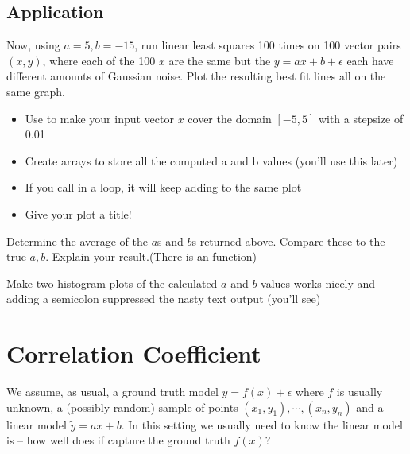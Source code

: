 \documentclass[letterpaper,10pt,english]{jupyterBook}
\begin{document}
\section{Application}
\label{\detokenize{lessons/least-squares-01:application}}
\sphinxAtStartPar
Now, using \(a=5, b =-15\), run linear least squares 100 times on 100 vector pairs \((x,y)\), where each of the 100 \(x\) are the same but the \(y=ax+b+\epsilon\) each have different amounts of Gaussian noise.  Plot the resulting best fit lines all on the same graph.
\begin{itemize}
\item {} 
\sphinxAtStartPar
Use  to make your input vector \(x\) cover the domain \([-5,5]\) with a step\sphinxhyphen{}size of 0.01

\item {} 
\sphinxAtStartPar
Create arrays to store all the computed a and b values (you’ll use this later)

\item {} 
\sphinxAtStartPar
If you call  in a loop, it will keep adding to the same plot

\item {} 
\sphinxAtStartPar
Give your plot a title!

\end{itemize}

\sphinxAtStartPar
Determine the average of the \(a\)s and \(b\)s returned above. Compare these to the true \(a,b\). Explain your result.(There is an  function)

\sphinxAtStartPar
Make two histogram plots of the calculated \(a\) and \(b\) values  works nicely and adding a semicolon suppressed the nasty text output (you’ll see)

\sphinxstepscope


\chapter{Correlation Coefficient}
\label{\detokenize{lessons/Correlation_Coefficient:correlation-coefficient}}\label{\detokenize{lessons/Correlation_Coefficient::doc}}
\sphinxAtStartPar
We assume, as usual, a ground truth model \(y = f(x) + \epsilon\) where \(f\) is usually unknown, a (possibly random) sample of points \((x_1, y_1), \cdots, (x_n, y_n)\) and a linear model \(\tilde{y} = ax + b\). In this setting we usually need to know  the linear model is – how well does if capture the ground truth \(f(x)\)?
\end{document}
